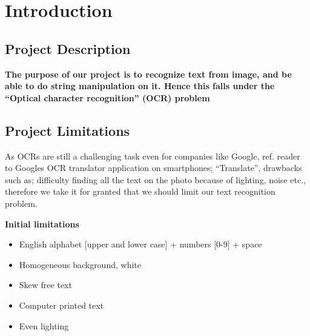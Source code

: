 \documentclass[Report.tex]{subfiles}
\begin{document}
\chapter{Introduction}
\label{sec:Introduction}
\section{Project Description}
\textbf{The purpose of our project is to recognize text from image, and be able to do string manipulation on it. Hence this falls under the ``Optical character recognition'' (OCR) problem}

\section{Project Limitations}
As OCRs are still a challenging task even for companies like
Google, ref. reader to Googles OCR translator application on smartphones;
``Translate'', drawbacks such as; difficulty finding all the text on the photo
because of lighting, noise etc., therefore we take it for granted that we should limit our text recognition problem.

\begin{flushleft}
  \textbf{Initial limitations}
  \begin{itemize}
    \item{English alphabet [upper and lower case] + numbers [0-9] + space}
    \item{Homogeneous background, white}
    \item{Skew free text}
    \item{Computer printed text}
    \item{Even lighting}
  \end{itemize}
\end{flushleft}
\end{document}
